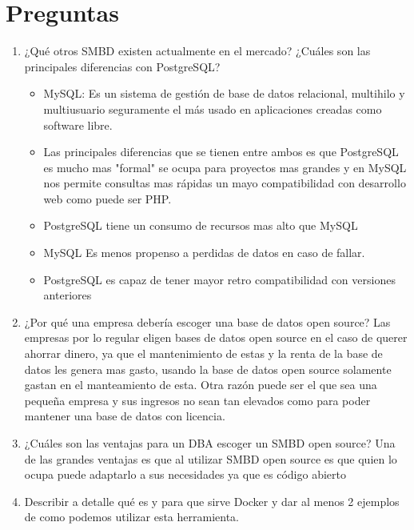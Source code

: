 \documentclass{article}
\begin{document}
\section{Preguntas}
\begin{enumerate}
    \item ¿Qué otros SMBD existen actualmente en el mercado? ¿Cuáles son las principales diferencias con PostgreSQL?
        \begin{itemize}
            \item MySQL: Es un sistema de gestión de base de datos relacional, multihilo y multiusuario seguramente el más usado en aplicaciones creadas como software libre.
    
            \item Las principales diferencias que se tienen entre ambos es que PostgreSQL es mucho mas "formal" se ocupa para proyectos mas grandes y en MySQL nos permite consultas mas rápidas un mayo compatibilidad con desarrollo web como puede ser PHP.
            
            \item PostgreSQL tiene un consumo de recursos mas alto que MySQL
            
            \item MySQL Es menos propenso a perdidas de datos en caso de fallar.
            
            \item PostgreSQL es capaz de tener mayor retro compatibilidad con versiones anteriores 
            
        \end{itemize}
    \item ¿Por qué una empresa debería escoger una base de datos open source?
    Las empresas por lo regular eligen bases de datos open source en el caso de querer ahorrar dinero, ya que el mantenimiento de estas y la renta de la base de datos les genera mas gasto, usando la base de datos open source solamente gastan en el manteamiento de esta. Otra razón puede ser el que sea una pequeña empresa y sus ingresos no sean tan elevados como para poder mantener una base de datos con licencia. 

    \item ¿Cuáles son las ventajas para un DBA escoger un SMBD open source?
    Una de las grandes ventajas es que al utilizar SMBD open source es que quien lo ocupa puede adaptarlo a sus necesidades ya que es código abierto 
    
    \item Describir a detalle qué es y para que sirve Docker y dar al menos 2 ejemplos de como podemos utilizar esta herramienta.
    

\end{enumerate}
\end{document}
